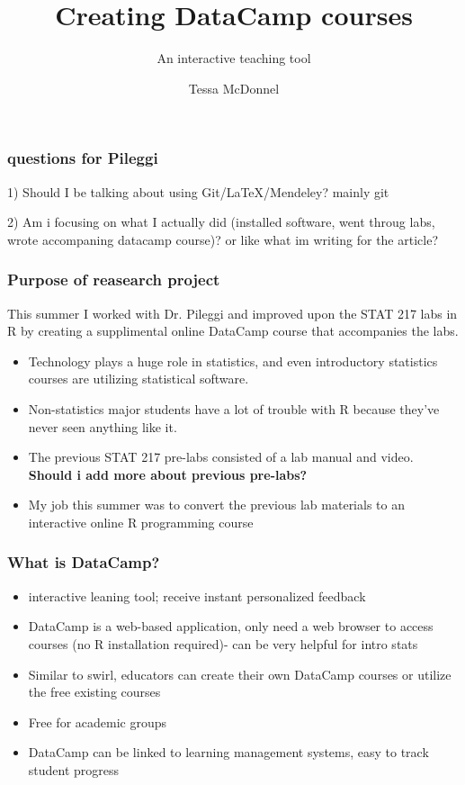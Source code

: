 \documentclass{beamer}
\title{Creating DataCamp courses}
\subtitle{An interactive teaching tool}
\author{Tessa McDonnel}
\institute{Cal Poly San Luis Obispo}
\date{}
\begin{document}
 
\frame{\titlepage}

\begin{frame}
\frametitle{questions for Pileggi}

1) Should I be talking about using Git/LaTeX/Mendeley? mainly git

2) Am i focusing on what I actually did (installed software, went throug labs, wrote accompaning datacamp course)? or like what im writing for the article?


\end{frame}

\begin{frame}
\frametitle{Purpose of reasearch project}

This summer I worked with Dr. Pileggi and improved upon the STAT 217 labs in R by creating
a supplimental online DataCamp course that accompanies the labs. 

\begin{itemize}
 \item<1-> Technology plays a huge role in statistics, and even introductory statistics courses are utilizing statistical software.
 \item<2-> Non-statistics major students have a lot of trouble with R because they've never seen anything like it.
 \item<3-> The previous STAT 217 pre-labs consisted of a lab manual and video. \textbf{Should i add more about previous pre-labs?}
 \item<4-> My job this summer was to convert the previous lab materials to an interactive online R programming course
\end{itemize}

\end{frame}
 
\begin{frame}
\frametitle{What is DataCamp?}
\begin{itemize}
 \item<1-> interactive leaning tool; receive instant personalized feedback
 \item<2-> DataCamp is a web-based application, only need a web browser to access courses (no R installation required)- can be very helpful for intro stats 
 \item<3-> Similar to swirl, educators can create their own DataCamp courses or utilize the free existing courses 
 \item<4-> Free for academic groups 
 \item<5-> DataCamp can be linked to learning management systems, easy to track student progress
\end{itemize}
\end{frame}
\end{document}
